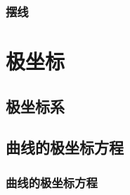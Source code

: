 \subsubsection{摆线}
\begin{Practice}
  \begin{question}
    \item 
    \item 
  \end{question}
\end{Practice}
\begin{Exercise}
  \begin{question}
    \item 
    \item 
    \item 
    \item 
    \item 
    \item 
    \item 
    \item 
    \item 
    \item 
  \end{question}
\end{Exercise}

\section{极坐标}
\subsection{极坐标系}
\begin{Practice}
  \begin{question}
    \item 
    \item 
    \item 
  \end{question}
\end{Practice}
\subsection{曲线的极坐标方程}
\subsubsection{曲线的极坐标方程}
\begin{Practice}
  \begin{question}
    \item 
    \item 
    \item 
  \end{question}
\end{Practice}
